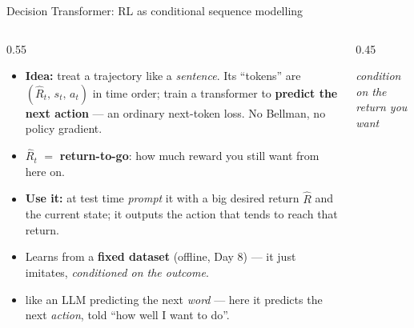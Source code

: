 \begin{frame}{Decision Transformer: RL as conditional sequence modelling}
\begin{columns}[c]
\begin{column}{0.55\textwidth}
\begin{itemize}\footnotesize\itemsep0.45em
    \item \textbf{Idea:} treat a trajectory like a \emph{sentence}. Its ``tokens'' are
          $(\hat R_t,\, s_t,\, a_t)$ in time order; train a transformer to
          \textbf{predict the next action} --- an ordinary next-token loss. No Bellman, no
          policy gradient.
    \item $\hat R_t$ $=$ \textbf{return-to-go}: how much reward you still want from here on.
    \item \textbf{Use it:} at test time \emph{prompt} it with a big desired return $\hat R$
          and the current state; it outputs the action that tends to reach that return.
    \item Learns from a \textbf{fixed dataset} (offline, Day 8) --- it just imitates,
          \emph{conditioned on the outcome}.
    \item {} like an LLM predicting the next \emph{word} --- here it predicts
          the next \emph{action}, told ``how well I want to do''.
\end{itemize}
\end{column}
\begin{column}{0.45\textwidth}
\centering
{}
\vspace{0.8em}

{\footnotesize\itshape condition on the return you want}
\end{column}
\end{columns}
\end{frame}

